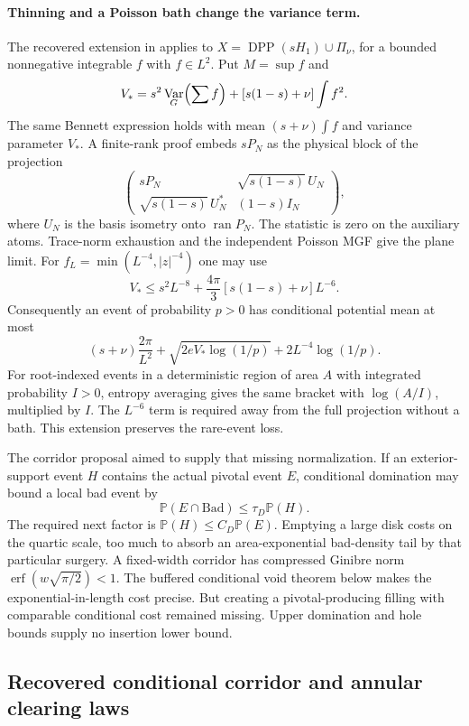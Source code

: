 \documentclass[11pt,a4paper]{article}
\theoremstyle{definition}
\theoremstyle{remark}
\numberwithin{equation}{section}
\DeclareMathOperator{\Var}{Var}
\begin{document}
\paragraph{Thinning and a Poisson bath change the variance term.}
\label{br:mixed-bennett}
The recovered extension in 
applies to $X=\operatorname{DPP}(sH_1)\cup\Pi_\nu$, for a bounded
nonnegative integrable $f$ with $f\in L^2$. Put $M=\sup f$ and
\[
 V_*=s^2\Var_G\Bigl(\sum f\Bigr)+[s(1-s)+\nu]\int f^2.
\]
The same Bennett expression holds with mean $(s+\nu)\int f$ and
variance parameter $V_*$. A finite-rank proof embeds $sP_N$ as the
physical block of the projection
\[
 \begin{pmatrix}
 sP_N&\sqrt{s(1-s)}\,U_N\\
 \sqrt{s(1-s)}\,U_N^*&(1-s)I_N
 \end{pmatrix},
\]
where $U_N$ is the basis isometry onto $\operatorname{ran}P_N$.
The statistic is zero on the auxiliary atoms. Trace-norm exhaustion
and the independent Poisson MGF give the plane limit.
For $f_L=\min(L^{-4},|z|^{-4})$ one may use
\[
 V_*\le s^2L^{-8}+\frac{4\pi}{3}[s(1-s)+\nu]L^{-6}.
\]
Consequently an event of probability $p>0$ has conditional potential
mean at most
\[
 (s+\nu)\frac{2\pi}{L^2}
       +\sqrt{2eV_*\log(1/p)}+2L^{-4}\log(1/p).
\]
For root-indexed events in a deterministic region of area $A$ with
integrated probability $I>0$, entropy averaging gives the same
bracket with $\log(A/I)$, multiplied by $I$.
The $L^{-6}$ term is required away from the full projection without
a bath. This extension preserves the rare-event loss.

The corridor proposal aimed to supply that missing normalization.
If an exterior-support event $H$ contains the actual pivotal event
$E$, conditional domination may bound a local bad event by
\[
 \mathbb P(E\cap\mathrm{Bad})\leq\tau_D\mathbb P(H).
\]
The required next factor is $\mathbb P(H)\leq C_D\mathbb P(E)$.
Emptying a large disk costs on the quartic scale, too much to absorb
an area-exponential bad-density tail by that particular surgery.
A fixed-width corridor has compressed Ginibre norm
$\operatorname{erf}(w\sqrt{\pi/2})<1$. The buffered conditional
void theorem below makes the exponential-in-length cost precise.
But creating a pivotal-producing filling
with comparable conditional cost remained missing.  Upper domination
and hole bounds supply no insertion lower bound.

\subsection{Recovered conditional corridor and annular clearing laws}
\label{br:clearing}
\end{document}
